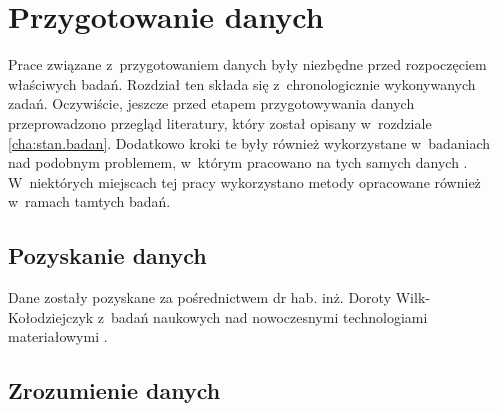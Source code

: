 \chapter{Przygotowanie danych}
\label{cha:przyg.danych}

Prace związane z~przygotowaniem danych były niezbędne przed rozpoczęciem właściwych badań. Rozdział ten składa się z~chronologicznie wykonywanych zadań. Oczywiście, jeszcze przed etapem przygotowywania danych przeprowadzono przegląd literatury, który został opisany w~rozdziale \ref{cha:stan.badan}. Dodatkowo kroki te były również wykorzystane w~badaniach nad podobnym problemem, w~którym pracowano na tych samych danych \cite{Reczek21}. W~niektórych miejscach tej pracy wykorzystano metody opracowane również w~ramach tamtych badań.

\section{Pozyskanie danych}
\label{sec:pozyskanie_danych}

Dane zostały pozyskane za pośrednictwem dr hab. inż. Doroty Wilk-Kołodziejczyk z~badań naukowych nad nowoczesnymi technologiami materiałowymi \cite{Pirowski17, specodlew}.

\section{Zrozumienie danych}
\label{sec:zrozumienie_danych}

